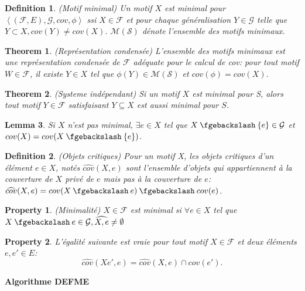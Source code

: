 \documentclass[a4paper,12pt,openany,oneside]{article}
\newcommand{\mysetminus}{\mathbin{\fgebackslash}}
\newtheorem{defn}{Definition} %
\newtheorem{theorem}{Theorem}[section]
\newtheorem{property}{Property}[theorem]
\newtheorem{lemma}[theorem]{Lemma}
\begin{document}
\begin{defn}(Motif minimal)
Un motif $X$ est \textit{minimal} pour $\left< (\mathcal{F},E),\mathcal{G},cov,\phi \right>$ ssi $X\in \mathcal{F}$ et pour chaque généralisation $Y\in\mathcal{G}$ telle que $Y\subset X, cov(Y)\neq cov(X)$. $\mathcal{M}(\mathcal{S})$
dénote l'ensemble des motifs minimaux.
\end{defn}

\begin{theorem}(Représentation condensée)
L'ensemble des motifs minimaux est une représentation condensée de $\mathcal{F}$ adéquate pour le calcul de cov: pour tout motif $W\in \mathcal{F}$, il existe $Y\in X$ tel que $\phi(Y)\in \mathcal{M}(\mathcal{S})$ et $cov(\phi)=cov(X)$.
\end{theorem}

\begin{theorem}(Systeme indépendant)
Si un motif $X$ est minimal pour S, alors tout motif $Y\in \mathcal{F}$ satisfaisant $Y\subseteq X$ est aussi minimal pour $S$.
\end{theorem}

\begin{lemma}
Si $X$ n'est pas minimal, $\exists e \in X$ tel que $X\mysetminus \{e\}\in \mathcal{G}$ et $cov(X)=cov(X\mysetminus\{e\})$.
\end{lemma}

\begin{defn}(Objets critiques)
Pour un motif X, les objets critiques d'un élément $e\in X$, notés $\widehat{cov}(X,e)$ sont l'ensemble d'objets qui appartiennent à la couverture de $X$ privé de $e$ mais pas à la couverture de $e$: $\widehat{cov}(X,e)=cov(X\mysetminus {e})\mysetminus cov(e)$.
\end{defn}

\begin{property} (Minimalité)
$X\in \mathcal{F}$ est minimal si $\forall e \in X$ tel que $X\mysetminus e\in \mathcal{G}, \widehat{X,e}\neq \emptyset $
\end{property}

\begin{property}
L'égalité suivante est vraie pour tout motif $X\in \mathcal{F}$ et deux éléments $e,e'\in E$:
\[
	\widehat{cov}(Xe',e)=\widehat{cov}(X,e)\cap cov(e').
\]
\end{property}

\textbf{Algorithme DEFME}
\end{document}
